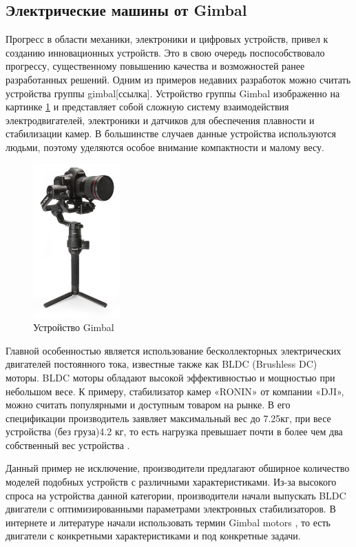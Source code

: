 \subsection{Электрические машины от Gimbal}
Прогресс в области механики, электроники и цифровых устройств, привел к созданию инновационных устройств. Это в свою очередь поспособствовало прогрессу, существенному повышению качества и возможностей ранее разработанных решений. Одним из примеров недавних разработок можно считать устройства группы gimbal[ссылка]. Устройство группы Gimbal изображенно на картинке \ref{gimbal} и представляет собой сложную систему взаимодействия электродвигателей, электроники и датчиков для обеспечения плавности и стабилизации камер. В большинстве случаев данные устройства используются людьми, поэтому уделяются особое внимание компактности и малому весу.

\begin{figure}[H]
	\centering
	\includegraphics[width=0.3\textwidth]{Src/images/Gimbal.png}
	\caption{Устройство Gimbal}
	\label{gimbal}
\end{figure}

Главной особенностью является использование бесколлекторных электрических двигателей постоянного тока, известные также как BLDC (Brushless DC) моторы. BLDC моторы обладают высокой эффективностью и мощностью при небольшом весе. К примеру, стабилизатор камер «RONIN» от компании «DJI», можно считать популярными и доступным товаром на рынке. В его спецификации производитель заявляет максимальный вес до 7.25кг, при весе устройства (без груза)4.2 кг, то есть нагрузка превышает почти в более чем два собственный вес устройства
\citep{ronin23}.

Данный пример не исключение, производители предлагают обширное количество моделей подобных устройств с различными характеристиками. Из-за высокого спроса на устройства данной категории, производители начали выпускать BLDC двигатели с оптимизированными параметрами электронных стабилизаторов. В интернете и литературе начали использовать термин Gimbal motors \citep{Lee2018}, то есть двигатели с конкретными характеристиками и под конкретные задачи.

